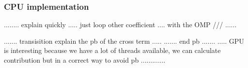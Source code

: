 \documentclass[oribibl]{llncs2e/llncs}
\begin{document}

\subsubsection{CPU implementation}
........ explain quickly ..... just loop other coefficient .... with the OMP /// ......



....... transisition explain the pb of the cross term ..... 
....... end pb .......
..... GPU is interesting because we have a lot of threads available, we can calculate contribution but in a correct way to avoid pb .............
\end{document}
